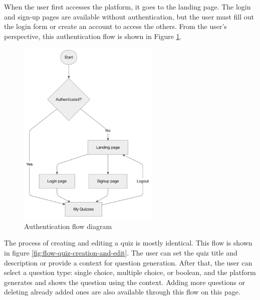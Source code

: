 When the user first accesses the platform, it goes to the landing page. The login and sign-up pages are available without authentication, but the user must fill out the login form or create an account to access the others. From the user's perspective, this authentication flow is shown in Figure \ref{fig:flow-authentication}.

\begin{figure}[H]
    \centering
    \includegraphics[width=0.6\textwidth, keepaspectratio]{figures/flow-authentication.png}
    \caption{Authentication flow diagram}
    \label{fig:flow-authentication}
\end{figure}

The process of creating and editing a quiz is mostly identical. This flow is shown in figure \ref{fig:flow-quiz-creation-and-edit}. The user can set the quiz title and description or provide a context for question generation. After that, the user can select a question type: single choice, multiple choice, or boolean, and the platform generates and shows the question using the context. Adding more questions or deleting already added ones are also available through this flow on this page.

